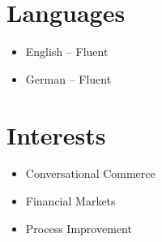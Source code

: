\documentclass[a4paper,10pt]{article}
\begin{document}
\section*{Languages}
\begin{itemize}[leftmargin=*]
    \item English -- Fluent
    \item German -- Fluent
\end{itemize}

\section*{Interests}
\begin{itemize}[leftmargin=*]
    \item Conversational Commerce
    \item Financial Markets
    \item Process Improvement
\end{itemize}
\end{document}
